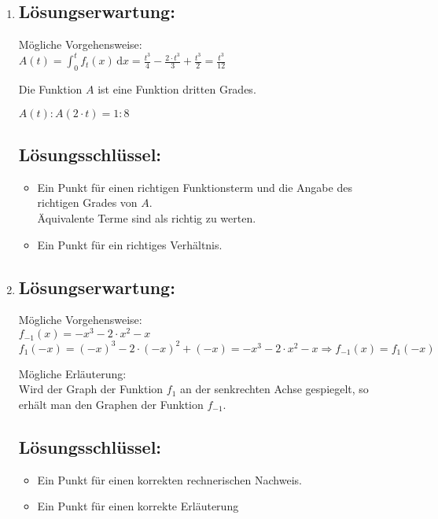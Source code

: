 \begin{langesbeispiel}
{\begin{enumerate}
\item \subsection{Lösungserwartung:}

Mögliche Vorgehensweise:\\
$A(t)=\displaystyle\int^t_0f_t(x)\,\text{d}x=\frac{t^3}{4}-\frac{2\cdot t^3}{3}+\frac{t^3}{2}=\frac{t^3}{12}$

Die Funktion $A$ ist eine Funktion dritten Grades.

$A(t):A(2\cdot t)=1:8$

\subsection{Lösungsschlüssel:}
\begin{itemize}
\item Ein Punkt für einen richtigen Funktionsterm und die Angabe des richtigen Grades von $A$.\\
Äquivalente Terme sind als richtig zu werten.
\item Ein Punkt für ein richtiges Verhältnis.
\end{itemize}

\item \subsection{Lösungserwartung:}

Mögliche Vorgehensweise:\\
$f_{-1}(x)=-x^3-2\cdot x^2-x$\\
$f_1(-x)=(-x)^3-2\cdot (-x)^2+(-x)=-x^3-2\cdot x^2-x \Rightarrow f_{-1}(x)=f_1(-x)$

Mögliche Erläuterung:\\
Wird der Graph der Funktion $f_1$ an der senkrechten Achse gespiegelt, so erhält man den Graphen der Funktion $f_{-1}$.

\subsection{Lösungsschlüssel:}
\begin{itemize}
\item Ein Punkt für einen korrekten rechnerischen Nachweis.
\item Ein Punkt für einen korrekte Erläuterung
\end{itemize}

\end{enumerate}}
\end{langesbeispiel}